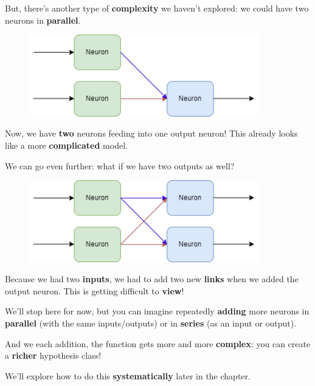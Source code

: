         But, there's another type of \textbf{complexity} we haven't explored: we could have two neurons in \textbf{parallel}.
        
        \begin{figure}[H]
        \centering
            \includegraphics[width=100mm,scale=0.4]{images/nn_images/three_neurons.png}
        \end{figure}
        
        Now, we have \textbf{two} neurons feeding into one output neuron! This already looks like a more \textbf{complicated} model. 
        
        We can go even further: what if we have two outputs as well?
        
        \begin{figure}[H]
        \centering
            \includegraphics[width=100mm,scale=0.4]{images/nn_images/four_neurons.png}
        \end{figure}
        
        Because we had two \textbf{inputs}, we had to add two new \textbf{links} when we added the output neuron. This is getting difficult to \textbf{view}!
        
        We'll stop here for now, but you can imagine repeatedly \textbf{adding} more neurons in \textbf{parallel} (with the same inputs/outputs) or in \textbf{series} (as an input or output).
        
        And we each addition, the function gets more and more \textbf{complex}: you can create a \textbf{richer} hypothesis class!
        
        We'll explore how to do this \textbf{systematically} later in the chapter.
            \\
        
